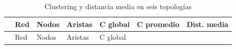 \documentclass[
  letterpaper,
  DIV=11,
  numbers=noendperiod]{scrreprt}
\begin{document}
\begin{longtable}[]{@{}
  >{\raggedright\arraybackslash}p{}
  >{\raggedright\arraybackslash}p{}
  >{\raggedleft\arraybackslash}p{}
  >{\raggedleft\arraybackslash}p{}
  >{\raggedleft\arraybackslash}p{}
  >{\raggedleft\arraybackslash}p{}
  >{\raggedleft\arraybackslash}p{}@{}}
\caption{Clustering y distancia media en seis topologías}\tabularnewline
\toprule\noalign{}
\begin{minipage}[b]{\linewidth}\raggedright
\end{minipage} & \begin{minipage}[b]{\linewidth}\raggedright
Red
\end{minipage} & \begin{minipage}[b]{\linewidth}\raggedleft
Nodos
\end{minipage} & \begin{minipage}[b]{\linewidth}\raggedleft
Aristas
\end{minipage} & \begin{minipage}[b]{\linewidth}\raggedleft
C global
\end{minipage} & \begin{minipage}[b]{\linewidth}\raggedleft
C promedio
\end{minipage} & \begin{minipage}[b]{\linewidth}\raggedleft
Dist. media
\end{minipage} \\
\midrule\noalign{}
\endfirsthead
\toprule\noalign{}
\begin{minipage}[b]{\linewidth}\raggedright
\end{minipage} & \begin{minipage}[b]{\linewidth}\raggedright
Red
\end{minipage} & \begin{minipage}[b]{\linewidth}\raggedleft
Nodos
\end{minipage} & \begin{minipage}[b]{\linewidth}\raggedleft
Aristas
\end{minipage} & \begin{minipage}[b]{\linewidth}\raggedleft
C global
\end{minipage} & \begin{minipage}[b]{\linewidth}\raggedleft

\end{minipage}
\end{longtable}
\end{document}
